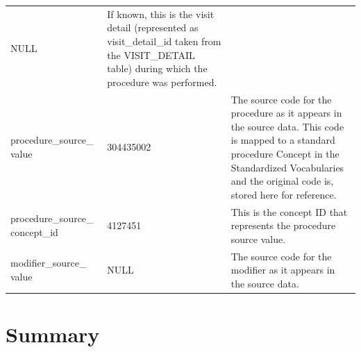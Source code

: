 \documentclass[11pt]{book}
\theoremstyle{definition}
\theoremstyle{definition}
\theoremstyle{definition}
\theoremstyle{remark}
\begin{document}
\begin{longtable}[]{@{}lll@{}}
\begin{minipage}[t]{0.15\columnwidth}
NULL\strut
\end{minipage} & \begin{minipage}[t]{0.49\columnwidth}\raggedright
If known, this is the visit detail (represented as visit\_detail\_id taken from the VISIT\_DETAIL table) during which the procedure was performed.\strut
\end{minipage}\tabularnewline
\begin{minipage}[t]{0.28\columnwidth}\raggedright
procedure\_source\_ value\strut
\end{minipage} & \begin{minipage}[t]{0.15\columnwidth}\raggedright
304435002\strut
\end{minipage} & \begin{minipage}[t]{0.49\columnwidth}\raggedright
The source code for the procedure as it appears in the source data. This code is mapped to a standard procedure Concept in the Standardized Vocabularies and the original code is, stored here for reference.\strut
\end{minipage}\tabularnewline
\begin{minipage}[t]{0.28\columnwidth}\raggedright
procedure\_source\_ concept\_id\strut
\end{minipage} & \begin{minipage}[t]{0.15\columnwidth}\raggedright
4127451\strut
\end{minipage} & \begin{minipage}[t]{0.49\columnwidth}\raggedright
This is the concept ID that represents the procedure source value.\strut
\end{minipage}\tabularnewline
\begin{minipage}[t]{0.28\columnwidth}\raggedright
modifier\_source\_ value\strut
\end{minipage} & \begin{minipage}[t]{0.15\columnwidth}\raggedright
NULL\strut
\end{minipage} & \begin{minipage}[t]{0.49\columnwidth}\raggedright
The source code for the modifier as it appears in the source data.\strut
\end{minipage}\tabularnewline
\bottomrule
\end{longtable}

\hypertarget{summary-1}{%
\section{Summary}\label{summary-1}}
\end{document}
